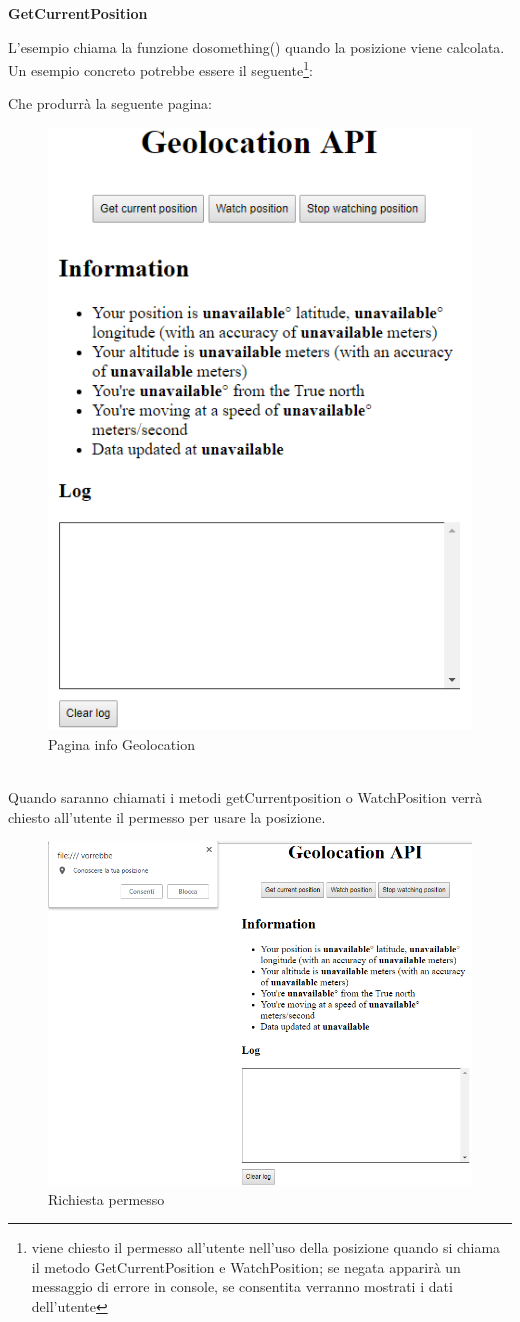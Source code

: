 \documentclass[11pt ,a4paper , twoside , openright ]{article}
\begin{document}
\textbf{GetCurrentPosition}

L'esempio chiama la funzione dosomething() quando la posizione viene calcolata. \\
Un esempio concreto potrebbe essere il seguente\footnote{viene chiesto il permesso all'utente nell'uso della posizione quando si chiama il metodo GetCurrentPosition e WatchPosition; se negata apparirà un messaggio di errore in console, se consentita verranno mostrati i dati dell'utente}: \\
\pagebreak

Che produrrà la seguente pagina:
\begin{figure}[h]
	\centering
	\includegraphics[width=0.5\linewidth]{geo1}
	\caption{Pagina info Geolocation}
	\label{fig: Pagina info Geolocation}
\end{figure}
\pagebreak
\\
Quando saranno chiamati i metodi getCurrentposition o WatchPosition verrà chiesto all'utente il permesso per usare la posizione.
\begin{figure}[h]
	\centering
	\includegraphics[width=0.4\linewidth]{geo2}
	\caption{Richiesta permesso}
	\label{fig: Richiesta permesso}
\end{figure}
\end{document}
